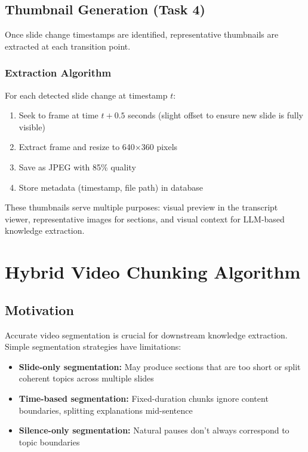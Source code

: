 \documentclass[12pt,a4paper]{article}
\begin{document}
\subsection{Thumbnail Generation (Task 4)}

Once slide change timestamps are identified, representative thumbnails are extracted at each transition point.

\subsubsection{Extraction Algorithm}

For each detected slide change at timestamp $t$:

\begin{enumerate}
    \item Seek to frame at time $t + 0.5$ seconds (slight offset to ensure new slide is fully visible)
    \item Extract frame and resize to 640$\times$360 pixels
    \item Save as JPEG with 85\% quality
    \item Store metadata (timestamp, file path) in database
\end{enumerate}

These thumbnails serve multiple purposes: visual preview in the transcript viewer, representative images for sections, and visual context for LLM-based knowledge extraction.

\newpage

\section{Hybrid Video Chunking Algorithm}
\label{sec:chunking}

\subsection{Motivation}

Accurate video segmentation is crucial for downstream knowledge extraction. Simple segmentation strategies have limitations:

\begin{itemize}
    \item \textbf{Slide-only segmentation:} May produce sections that are too short or split coherent topics across multiple slides
    \item \textbf{Time-based segmentation:} Fixed-duration chunks ignore content boundaries, splitting explanations mid-sentence
    \item \textbf{Silence-only segmentation:} Natural pauses don't always correspond to topic boundaries
\end{itemize}
\end{document}
